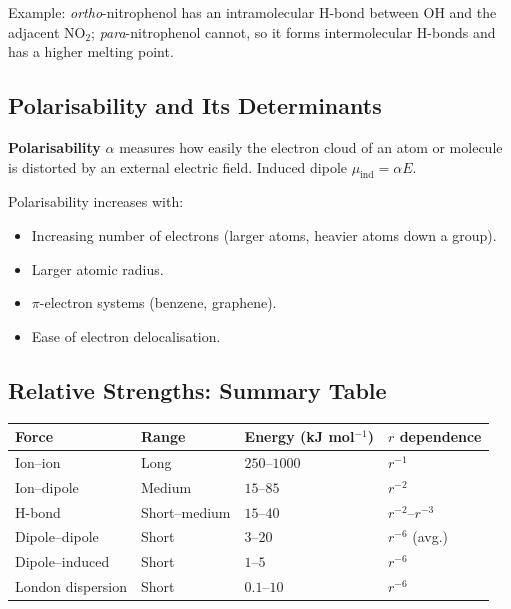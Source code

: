 \documentclass[12pt,a4paper]{article}
\begin{document}
Example: \emph{ortho}-nitrophenol has an intramolecular H-bond between OH and the adjacent $\mathrm{NO_2}$; \emph{para}-nitrophenol cannot, so it forms intermolecular H-bonds and has a higher melting point.

\subsection{Polarisability and Its Determinants}

\begin{tcolorbox}[defbox]
\textbf{Polarisability} $\alpha$ measures how easily the electron cloud of an atom or molecule is distorted by an external electric field. Induced dipole $\mu_{\mathrm{ind}} = \alpha E$.
\end{tcolorbox}

Polarisability increases with:
\begin{itemize}[leftmargin=*, itemsep=1pt, topsep=2pt]
  \item Increasing number of electrons (larger atoms, heavier atoms down a group).
  \item Larger atomic radius.
  \item $\pi$-electron systems (benzene, graphene).
  \item Ease of electron delocalisation.
\end{itemize}

\subsection{Relative Strengths: Summary Table}
\begin{tabularx}{\linewidth}{|B{2.8cm}|Y|Y|Y|}
\hline
\textbf{Force} & \textbf{Range} & \textbf{Energy (kJ mol$^{-1}$)} & \textbf{$r$ dependence} \\
\hline
Ion--ion & Long & $250$--$1000$ & $r^{-1}$ \\
\hline
Ion--dipole & Medium & $15$--$85$ & $r^{-2}$ \\
\hline
H-bond & Short--medium & $15$--$40$ & $r^{-2}$--$r^{-3}$ \\
\hline
Dipole--dipole & Short & $3$--$20$ & $r^{-6}$ (avg.) \\
\hline
Dipole--induced & Short & $1$--$5$ & $r^{-6}$ \\
\hline
London dispersion & Short & $0.1$--$10$ & $r^{-6}$ \\
\hline
\end{tabularx}
\end{document}
